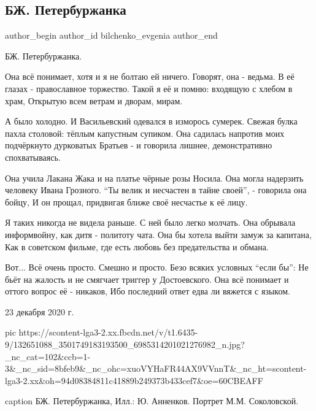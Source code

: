  
 
 
 
 
 
\subsection{БЖ. Петербуржанка}
\label{sec:24_12_2020.fb.bilchenko_evgenia.3.peterburzhanka}
\ifcmt
 author_begin
   author_id bilchenko_evgenia
 author_end
\fi

БЖ. Петербуржанка.

Она всё понимает, хотя и я не болтаю ей ничего.
Говорят, она - ведьма. В её глазах - православное торжество.
Такой я её и помню: входящую с хлебом в храм,
Открытую всем ветрам и дворам, мирам.

А было холодно. И Васильевский одевался в изморось сумерек.
Свежая булка пахла столовой: тёплым капустным супиком.
Она садилась напротив моих подчёркнуто дурковатых
Братьев - и говорила лишнее, демонстративно спохватываясь.

Она учила Лакана Жака и на платье чёрные розы
Носила. Она могла надерзить человеку Ивана Грозного.
\enquote{Ты велик и несчастен в тайне своей}, - говорила она бойцу,
И он прощал, придвигая ближе своё несчастье к её лицу.

Я таких никогда не видела раньше. С ней было легко молчать.
Она обрывала информвойну, как дитя - политоту чата.
Она бы хотела выйти замуж за капитана,
Как в советском фильме, где есть любовь без предательства и обмана.

Вот... Всё очень просто. Смешно и просто. Безо всяких условных \enquote{если бы}:
Не бьёт на жалость и не смягчает триггер у Достоевского.
Она всё понимает и оттого вопрос её - никаков,
Ибо последний ответ едва ли вяжется с языком.

23 декабря 2020 г.

\ifcmt
  pic https://scontent-lga3-2.xx.fbcdn.net/v/t1.6435-9/132651088_3501749183193500_6985314201021276982_n.jpg?_nc_cat=102&ccb=1-3&_nc_sid=8bfeb9&_nc_ohc=xuoVYHaFR44AX9VVnnT&_nc_ht=scontent-lga3-2.xx&oh=94d08384811c41889b249373b433cef7&oe=60CBEAFF

	caption БЖ. Петербуржанка, Илл.: Ю. Анненков. Портрет М.М. Соколовской.
\fi


